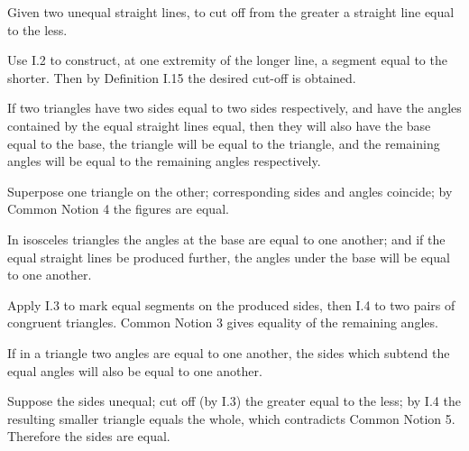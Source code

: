 \begin{claim}
\label{prop:I.3}
Given two unequal straight lines, to cut off from the greater a
straight line equal to the less.
\end{claim}
\begin{evidence}[Proof of I.3]
\label{ev:I.3}
Use I.2 to construct, at one extremity of the longer line, a segment
equal to the shorter.  Then by Definition I.15 the desired cut-off is
obtained.
\end{evidence}

\begin{claim}
\label{prop:I.4}
If two triangles have two sides equal to two sides respectively, and
have the angles contained by the equal straight lines equal, then they
will also have the base equal to the base, the triangle will be equal
to the triangle, and the remaining angles will be equal to the
remaining angles respectively.
\end{claim}
\begin{evidence}[Proof of I.4]
\label{ev:I.4}
Superpose one triangle on the other; corresponding sides and angles
coincide; by Common Notion 4 the figures are equal.
\end{evidence}

\begin{claim}
\label{prop:I.5}
In isosceles triangles the angles at the base are equal to one
another; and if the equal straight lines be produced further, the
angles under the base will be equal to one another.
\end{claim}
\begin{evidence}[Proof of I.5]
\label{ev:I.5}

Apply I.3 to mark equal segments on the produced sides, then I.4 to
two pairs of congruent triangles.  Common Notion 3 gives equality of
the remaining angles.
\end{evidence}

\begin{claim}
\label{prop:I.6}
If in a triangle two angles are equal to one another, the sides which
subtend the equal angles will also be equal to one another.
\end{claim}
\begin{evidence}[Proof of I.6]
\label{ev:I.6}
Suppose the sides unequal; cut off (by I.3) the greater equal to the
less; by I.4 the resulting smaller triangle equals the whole, which
contradicts Common Notion 5.  Therefore the sides are equal.
\end{evidence}

